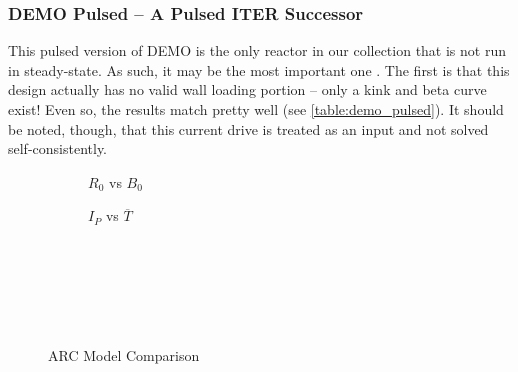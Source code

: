 
\subsubsection{DEMO Pulsed -- A Pulsed ITER Successor}

This pulsed version of DEMO is the only reactor in our collection that is not run in steady-state. As such, it may be the most important one . The first  is that this design actually has no valid wall loading portion -- only a kink and beta curve exist! Even so, the results match pretty well (see \cref{table:demo_pulsed}). It should be noted, though, that this current drive is treated as an input and not solved self-consistently.

\clearpage

\newpage

\begin{figure*}[t!]
    \centering
    \hfill
    \begin{subfigure}[t]{0.45\textwidth}
        \centering
    \begin{adjustbox}{width=\textwidth}
      \Large
      
    \end{adjustbox}
        \caption{$R_0$ vs $B_0$}
    \end{subfigure}
    \hfill
    \begin{subfigure}[t]{0.45\textwidth}
        \centering
    \begin{adjustbox}{width=\textwidth}
      \Large
      
    \end{adjustbox}
        \caption{$I_P$ vs $\overline T$}
    \end{subfigure}
    \hfill \hfill ~\\ ~\\ ~\\
    \caption{ARC Model Comparison} ~\\
    \label{fig:arc_comparison}
\end{figure*}

